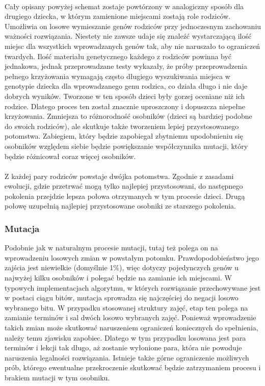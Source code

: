 \paragraph{}Cały opisany powyżej schemat zostaje powtórzony w analogiczny sposób dla drugiego dziecka, w którym zamienione miejscami zostają role rodziców. Umożliwia on losowe wymieszanie genów rodziców przy jednoczesnym zachowaniu ważności rozwiązania. Niestety nie zawsze udaje się znaleźć wystarczającą ilość miejsc dla wszystkich wprowadzanych genów tak, aby nie naruszało to ograniczeń twardych. Ilość materiału genetycznego każdego z rodziców powinna być jednakowa, jednak przeprowadzane testy wykazały, że próby przeprowadzenia pełnego krzyżowania wymagają często długiego wyszukiwania miejsca w genotypie dziecka dla wprowadzanego genu rodzica, co działa długo i nie daje dobrych wyników. Tworzone w ten sposób dzieci były gorzej oceniane niż ich rodzice. Dlatego proces ten został znacznie uproszczony i dopuszcza niepełne krzyżowania. Zmniejsza to różnorodność osobników (dzieci są bardziej podobne do swoich rodziców), ale skutkuje także tworzeniem lepiej przystosowanego potomstwa. Zabiegiem, który będzie zapobiegał zbytniemu upodobnieniu się osobników względem siebie będzie powiększanie współczynnika mutacji, który będzie różnicował coraz więcej osobników.
\paragraph{}Z każdej pary rodziców powstaje dwójka potomstwa. Zgodnie z zasadami ewolucji, gdzie przetrwać mogą tylko najlepiej przystosowani, do następnego pokolenia przejdzie lepsza połowa otrzymanych w tym procesie dzieci. Drugą połowę uzupełnią najlepiej przystosowane osobniki ze starszego pokolenia.
\subsubsection{Mutacja}
Podobnie jak w naturalnym procesie mutacji, tutaj też polega on na wprowadzeniu losowych zmian w powstałym potomku. Prawdopodobieństwo jego zajścia jest niewielkie (domyślnie 1\%), więc dotyczy pojedynczych genów u najwyżej kilku osobników i polegać będzie na zamianie ich miejscami. W typowych implementacjach algorytmu, w których rozwiązanie przechowywane jest w postaci ciągu bitów, mutacja sprowadza się najczęściej do negacji losowo wybranego bitu. W przypadku stosowanej struktury zajęć, etap ten polega na zamianie terminów i sal dwóch losowo wybranych zajęć. Ponieważ wprowadzenie takich zmian może skutkować naruszeniem ograniczeń koniecznych do spełnienia, należy temu zjawisku zapobiec. Dlatego w tym przypadku losowana jest para terminów i lekcji tak długo, aż zostanie wyłonione para, która nie powoduje naruszenia legalności rozwiązania. Istnieje także górne ograniczenie możliwych prób, którego ewentualne przekroczenie skutkować będzie zatrzymaniem procesu i brakiem mutacji w tym osobniku.
